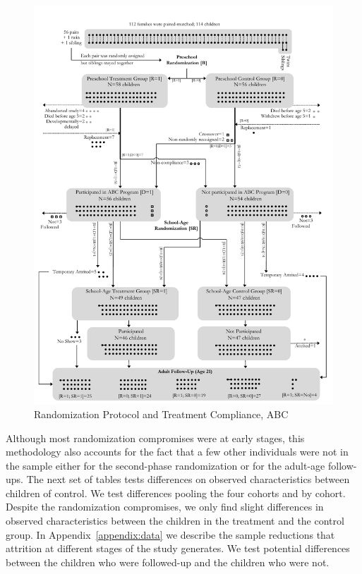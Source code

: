 \begin{center}
	\begin{figure}[H]
		\caption{Randomization Protocol and Treatment Compliance, ABC} \label{fig:abc-flow}
		\centering
		\includegraphics[width=.7\columnwidth]{output/abc_Diagram.pdf}
	\end{figure}
\end{center}

\noindent Although most randomization compromises were at early stages, this methodology also accounts for the fact that a few other individuals were not in the sample either for the second-phase randomization or for the adult-age follow-ups. The next set of tables tests differences on observed characteristics between children of control. We test differences pooling the four cohorts and by cohort. Despite the randomization compromises, we only find slight differences in observed characteristics between the children in the treatment and the control group. In Appendix~\ref{appendix:data} we describe the sample reductions that attrition at different stages of the study generates. We test potential differences between the children who were followed-up and the children who were not.\\

